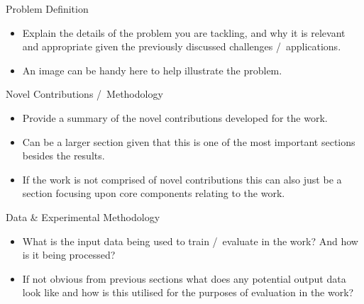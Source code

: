 \documentclass[final,hyperref={pdfpagelabels=false}]{beamer}
\begin{document}
\begin{frame}[t]
\begin{columns}[t]
\begin{column}{.49\textwidth}
    \vspace{-1.05cm}
    
    \begin{block}{Problem Definition}
      \begin{itemize}
          \item Explain the details of the problem you are tackling, and why it is relevant and appropriate given the previously discussed challenges \slash\ applications.
          \item An image can be handy here to help illustrate the problem.
      \end{itemize}
    \end{block}

    \vspace{-1.05cm}

    \begin{block}{Novel Contributions \slash\ Methodology}
      \begin{itemize}
          \item Provide a summary of the novel contributions developed for the work.
          \item Can be a larger section given that this is one of the most important sections besides the results.
          \item If the work is not comprised of novel contributions this can also just be a section focusing upon core components relating to the work.
      \end{itemize}
    \end{block}
    
    \vspace{-1.05cm}

    \begin{block}{Data \& Experimental Methodology}
      \begin{itemize}
          \item What is the input data being used to train \slash\ evaluate in the work? And how is it being processed?
          \item If not obvious from previous sections what does any potential output data look like and how is this utilised for the purposes of evaluation in the work?
      \end{itemize}
    \end{block}
    
  \end{column} %


\end{columns}
\end{frame}
\end{document}

